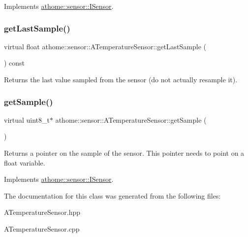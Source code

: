 Implements \mbox{\hyperlink{classathome_1_1sensor_1_1_i_sensor_a95785b54ffe3a8f7e48c81b5732e3b9f}{athome\+::sensor\+::\+I\+Sensor}}.

\mbox{\label{classathome_1_1sensor_1_1_a_temperature_sensor_a1063bddc4a031d80f68a83317b64fbb2}} 
\subsubsection{\texorpdfstring{get\+Last\+Sample()}{getLastSample()}}
{\footnotesize\ttfamily virtual float athome\+::sensor\+::\+A\+Temperature\+Sensor\+::get\+Last\+Sample (\begin{DoxyParamCaption}{ }\end{DoxyParamCaption}) const\hspace{0.3cm}{\ttfamily [pure virtual]}}

Returns the last value sampled from the sensor (do not actually resample it). \mbox{\label{classathome_1_1sensor_1_1_a_temperature_sensor_a397794217f3163950add6d28f69a6202}} 
\subsubsection{\texorpdfstring{get\+Sample()}{getSample()}}
{\footnotesize\ttfamily virtual uint8\+\_\+t$\ast$ athome\+::sensor\+::\+A\+Temperature\+Sensor\+::get\+Sample (\begin{DoxyParamCaption}{ }\end{DoxyParamCaption})\hspace{0.3cm}{\ttfamily [pure virtual]}}

Returns a pointer on the sample of the sensor. This pointer needs to point on a float variable. 

Implements \mbox{\hyperlink{classathome_1_1sensor_1_1_i_sensor_a2513fd8acc5d8251439330ca0e78cf04}{athome\+::sensor\+::\+I\+Sensor}}.



The documentation for this class was generated from the following files\+:\begin{DoxyCompactItemize}
\item 
A\+Temperature\+Sensor.\+hpp\item 
A\+Temperature\+Sensor.\+cpp\end{DoxyCompactItemize}
